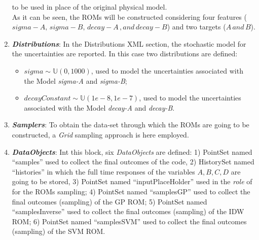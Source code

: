 \begin{enumerate}
 to be used in place of the original physical model.
 \\As it can be seen,
 the ROMs will be constructed considering four features ($sigma-A,\,sigma-B,\, decay-A \,,and \, decay-B$) and two targets
 ($A \, and \, B$).
   \item \textbf{\textit{Distributions}}:
  In the Distributions XML section, the stochastic model for the
  uncertainties are reported. In
  this case two distributions are defined:
  \begin{itemize}
    \item $sigma \sim \mathbb{U}(0,1000)$, used to model the uncertainties
    associated with  the Model \textit{sigma-A} and \textit{sigma-B};
    \item  $decayConstant \sim \mathbb{U}(1e-8,1e-7)$,  used to
    model the uncertainties
    associated with  the Model \textit{decay-A} and \textit{decay-B}.
  \end{itemize}
   \item \textbf{\textit{Samplers}}:
  To obtain the data-set through which the ROMs are going to be
  constructed, a \textit{Grid} sampling approach is here employed.
   \item \textbf{\textit{DataObjects}}:
  Int this block, six \textit{DataObjects} are defined: 1) PointSet
  named ``samples'' used to collect the final outcomes of the code, 2)
  HistorySet named ``histories'' in which the full time responses of the
  variables $A,B,C,D$ are going to be stored, 3) PointSet named
  ``inputPlaceHolder'' used in the \textit{role} of  for the ROMs sampling;
  4) PointSet named ``samplesGP'' used to collect the final outcomes (sampling) of the GP ROM;
  5) PointSet named ``samplesInverse'' used to collect the final outcomes (sampling) of the IDW ROM;
  6) PointSet named ``samplesSVM'' used to collect the final outcomes (sampling) of the SVM ROM.
 \begin{figure}[h!]
  \centering

\end{figure}
\end{enumerate}
